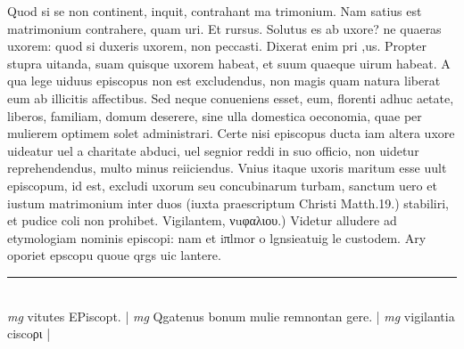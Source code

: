 \documentclass{article}
\begin{document}
\begin{pages}
Quod si se non continent, inquit, contrahant ma trimonium. Nam satius est matrimonium contrahere, quam uri. Et rursus. Solutus es ab uxore? ne quaeras uxorem: quod si duxeris uxorem, non peccasti. Dixerat enim pri ,us. Propter stupra uitanda, suam quisque uxorem habeat, et suum quaeque uirum habeat. A qua lege uiduus episcopus non est excludendus, non magis quam natura liberat eum ab illicitis affectibus. Sed neque conueniens esset, eum, florenti adhuc aetate, liberos, familiam, domum deserere, sine ulla domestica oeconomia, quae per mulierem optimem solet administrari. Certe nisi episcopus ducta iam altera uxore uideatur uel a charitate abduci, uel segnior reddi in suo officio, non uidetur reprehendendus, multo minus reiiciendus. Vnius itaque uxoris maritum esse uult episcopum, id est, excludi uxorum seu concubinarum turbam, sanctum uero et iustum matrimonium inter duos (iuxta praescriptum Christi Matth.19.) stabiliri, et pudice coli non prohibet.  \pend\pstart  Vigilantem, νuφαλιου.) Videtur alludere ad etymologiam nominis episcopi: nam et iπlmor o lgnsieatuig le custodem. Ary oporiet epscopu quoue qrgs uic lantere.  \pend
\vspace{0.5cm}\noindent
\vspace{0.2cm}\rule{1cm}{0.2pt}\\ 
\hspace{0.2cm}\textit{mg}
\footnotesize vitutes EPiscopt. 
\normalsize| 
\hspace{0.2cm}\textit{mg}
\footnotesize Qgatenus bonum mulie remnontan gere. 
\normalsize| 
\hspace{0.2cm}\textit{mg}
\footnotesize vigilantia ciscoρι 
\normalsize| 

\end{pages}
\end{document}
